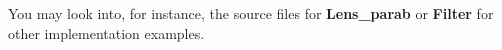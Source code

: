 You may look into, for instance, the source files for
\textbf{Lens\_parab} or \textbf{Filter}
for other implementation examples.

%
%
%
%
%

